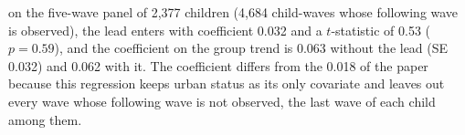 on the five-wave panel of 2,377 children (4,684 child-waves whose following wave is observed), the lead enters with coefficient 0.032 and a $t$-statistic of 0.53 ($p = 0.59$), and the coefficient on the group trend is 0.063 without the lead (SE 0.032) and 0.062 with it. The coefficient differs from the 0.018 of the paper because this regression keeps urban status as its only covariate and leaves out every wave whose following wave is not observed, the last wave of each child among them.%
